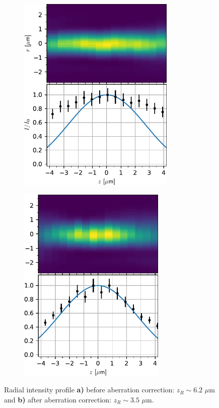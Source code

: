 \begin{figure}
\centering
	\begin{subfigure}{.49\textwidth}
	    \centering
		\includegraphics[height=9.5cm]{figures/AxialImageTweezerScanUncorrected.pdf}
		\caption{}
		\label{fig:AxialUncorrected}
	\end{subfigure}
	\begin{subfigure}{.49\textwidth}
		\centering
		\includegraphics[height=9.5cm]{figures/AxialImageTweezerScan.pdf}
		\caption{}
		\label{fig:AxialZernike}
	\end{subfigure}
	\caption{Radial intensity profile \textbf{a)} before aberration correction: $z_R \sim 6.2$ $\mu$m and \textbf{b)} after aberration correction: $z_R \sim 3.5$ $\mu$m.}
	\label{fig:AxialScans}
\end{figure}

